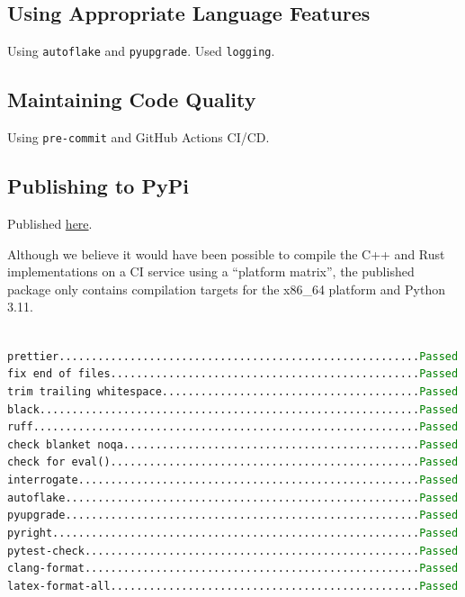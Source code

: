 \documentclass{prettytex/ox/mmsc-special-topic}
\begin{document}
  \subsection{Using Appropriate Language Features}
  Using \texttt{autoflake} and \texttt{pyupgrade}.
  Used \texttt{logging}.
  \subsection{Maintaining Code Quality}
  Using \texttt{pre-commit} and GitHub Actions CI/CD.

  \subsection{Publishing to PyPi}
  Published \href{https://pypi.org/project/melon-scheduler/}{here}.

  Although we believe it would have been possible to compile the C++ and Rust implementations on a CI service using a ``platform matrix'', the published package only contains compilation targets for the x86\_64 platform and Python 3.11.

  \texttt{
    \hspace*{-1em} prettier........................................................\textcolor{green}{Passed} \\
    fix end of files................................................\textcolor{green}{Passed} \\
    trim trailing whitespace........................................\textcolor{green}{Passed} \\
    black...........................................................\textcolor{green}{Passed} \\
    ruff............................................................\textcolor{green}{Passed} \\
    check blanket noqa..............................................\textcolor{green}{Passed} \\
    check for eval()................................................\textcolor{green}{Passed} \\
    interrogate.....................................................\textcolor{green}{Passed} \\
    autoflake.......................................................\textcolor{green}{Passed} \\
    pyupgrade.......................................................\textcolor{green}{Passed} \\
    pyright.........................................................\textcolor{green}{Passed} \\
    pytest-check....................................................\textcolor{green}{Passed} \\
    clang-format....................................................\textcolor{green}{Passed} \\
    latex-format-all................................................\textcolor{green}{Passed}
  }
\end{document}
